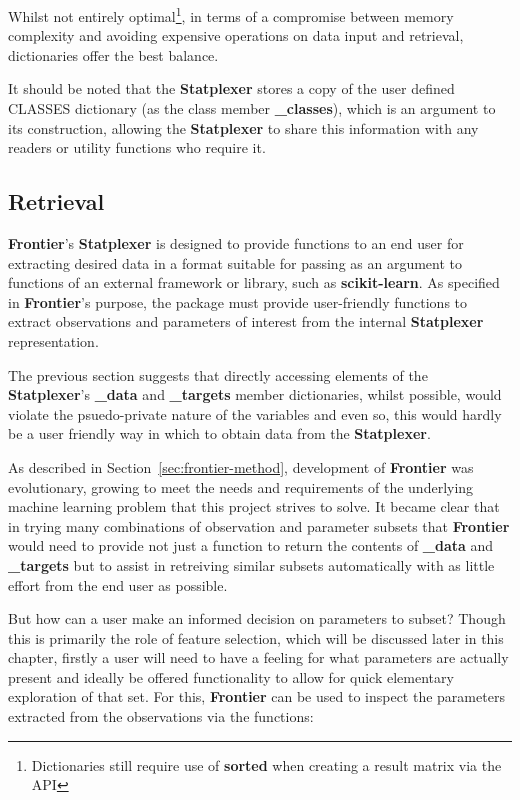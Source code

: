 Whilst not entirely optimal\footnote{Dictionaries still require use of
\textbf{sorted} when creating a result matrix via the API}, in terms of a
compromise between memory complexity and avoiding expensive operations on data
input and retrieval, dictionaries offer the best balance.

It should be noted that the \textbf{Statplexer} stores a copy of the user
defined CLASSES dictionary (as the class member \textbf{\_classes}), which is an
argument to its construction, allowing the \textbf{Statplexer} to share this
information with any readers or utility functions who require it.


\subsection{Retrieval}

\textbf{Frontier}'s \textbf{Statplexer} is designed to provide functions to an
end user for extracting desired data in a format suitable for passing as an
argument to functions of an external framework or library, such as
\textbf{scikit-learn}. As specified in \textbf{Frontier}'s purpose, the package
must provide user-friendly functions to extract observations and parameters of
interest from the internal \textbf{Statplexer} representation.

The previous section suggests that directly accessing elements of the
\textbf{Statplexer}'s \textbf{\_data} and \textbf{\_targets} member dictionaries,
whilst possible, would violate the psuedo-private nature of the variables and even
so, this would hardly be a user friendly way in which to obtain data from the
\textbf{Statplexer}.

As described in Section~\ref{sec:frontier-method}, development of
\textbf{Frontier} was evolutionary, growing to meet the needs and requirements
of the underlying machine learning problem that this project strives to solve.
It became clear that in trying many combinations of observation and parameter
subsets that \textbf{Frontier} would need to provide not just a function to
return the contents of \textbf{\_data} and \textbf{\_targets} but to assist in
retreiving similar subsets automatically with as little effort from the end user
as possible.

But how can a user make an informed decision on parameters to subset?
Though this is primarily the role of feature selection, which will be discussed
later in this chapter, firstly a user will need to have a feeling for what
parameters are actually present and ideally be offered functionality to
allow for quick elementary exploration of that set. For this, \textbf{Frontier}
can be used to inspect the parameters extracted from the observations via the
functions:


